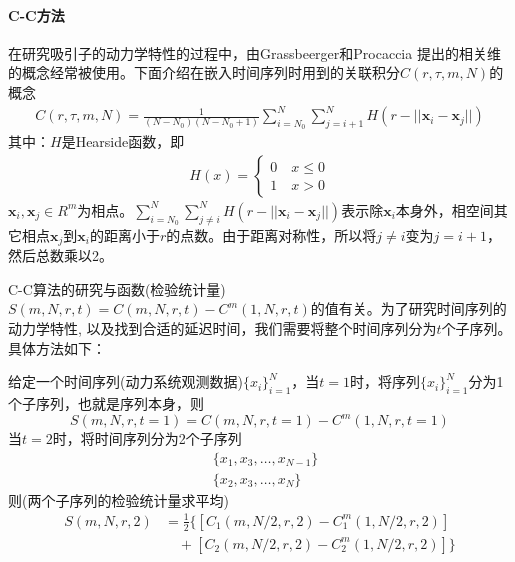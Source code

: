             \paragraph{C-C方法}
            在研究吸引子的动力学特性的过程中，由Grassbeerger和Procaccia 提出的相关维的概念经常被使用。下面介绍在嵌入时间序列时用到的关联积分$C(r,\tau, m, N)$的概念
            \begin{align}
                \label{关联积分}
                C(r,\tau, m, N) = \frac{1}{(N-N_0) (N - N_0 + 1)} \sum_{i=N_0}^N \sum_{j = i + 1} ^N H(r - ||\mathbf{x}_i - \mathbf{x}_j||)
            \end{align}
            \noindent 其中：$H$是Hearside函数，即
            \begin{align*}
                H(x) =
                \left\{
                    \begin{aligned}
                        0 \quad x\leq 0\\
                        1 \quad x>0
                    \end{aligned}
                \right.
            \end{align*}
            $\mathbf{x}_i,\mathbf{x}_j \in R^m$为相点。$\sum_{i=N_0}^N \sum_{j \neq i} ^N H(r - ||\mathbf{x}_i - \mathbf{x}_j||)$表示除$\mathbf{x}_i$本身外，相空间其它相点$\mathbf{x}_j$到$\mathbf{x}_i$的距离小于$r$的点数。由于距离对称性，所以将$j \neq i$变为$j = i + 1$，然后总数乘以2。
            \par
            C-C算法的研究与函数(检验统计量)$S(m,N,r,t) = C(m,N,r,t) - C^m(1,N,r,t)$的值有关。为了研究时间序列的动力学特性, 以及找到合适的延迟时间，我们需要将整个时间序列分为$t$个子序列。具体方法如下：
            \par
            给定一个时间序列(动力系统观测数据)$\{x_i\}_{i=1}^N$，当$t = 1$时，将序列$\{x_i\}_{i=1}^N$分为1个子序列，也就是序列本身，则
            \[
                S(m,N,r,t = 1) = C(m,N,r,t = 1) - C^m(1,N,r,t = 1)
            \]
            当$ t=2 $时，将时间序列分为2个子序列
            \begin{align*}
                & \{x_1,x_3,\dots,x_{N-1}\} \\
                & \{x_2,x_3,\dots,x_{N}\}
            \end{align*}
            则(两个子序列的检验统计量求平均)
            \begin{align*}
                S(m,N,r,2) &= \frac{1}{2} \{[C_1(m,N/2,r,2) - C_1^m(1,N/2,r,2)] \\
                           &\quad + [C_2(m,N/2,r,2) - C_2^m(1,N/2,r,2)]\}
            \end{align*}
